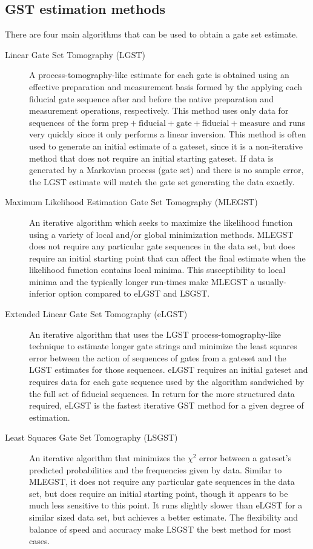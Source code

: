 \documentclass{article}[11pt]
\begin{document}
\subsection{GST estimation methods\label{secCompareMethods}}
There are four main algorithms that can be used to obtain a gate set estimate.
\begin{description}
\item[Linear Gate Set Tomography (LGST)] A process-tomography-like estimate for each gate is obtained using an effective preparation and measurement basis formed by the applying each fiducial gate sequence after and before the native preparation and measurement operations, respectively.  This method uses only data for sequences of the form $\mbox{prep} + \mbox{fiducial} + \mbox{gate} + \mbox{fiducial} + \mbox{measure}$ and runs very quickly since it only performs a linear inversion.  This method is often used to generate an initial estimate of a gateset, since it is a non-iterative method that does not require an initial starting gateset.  If data is generated by a Markovian process (gate set) and there is no sample error, the LGST estimate will match the gate set generating the data exactly.

\item[Maximum Likelihood Estimation Gate Set Tomography (MLEGST)]  An iterative algorithm which seeks to maximize the likelihood function using a variety of local and/or global minimization methods.  MLEGST does not require any particular gate sequences in the data set, but does require an initial starting point that can affect the final estimate when the likelihood function contains local minima.  This susceptibility to local minima and the typically longer run-times make MLEGST a usually-inferior option compared to eLGST and LSGST.

\item[Extended Linear Gate Set Tomography (eLGST)] An iterative algorithm that uses the LGST process-tomography-like technique to estimate longer gate strings and minimize the least squares error between the action of sequences of gates from a gateset and the LGST estimates for those sequences. eLGST requires an initial gateset and requires data for each gate sequence used by the algorithm sandwiched by the full set of fiducial sequences.  In return for the more structured data required, eLGST is the fastest iterative GST method for a given degree of estimation.

\item[Least Squares Gate Set Tomography (LSGST)] An iterative algorithm that minimizes the $\chi^2$ error between a gateset's predicted probabilities and the frequencies given by data.  Similar to MLEGST, it does not require any particular gate sequences in the data set, but does require an initial starting point, though it appears to be much less sensitive to this point.  It runs slightly slower than eLGST for a similar sized data set, but achieves a better estimate.  The flexibility and balance of speed and accuracy make LSGST the best method for most cases.
\end{description}
\end{document}
